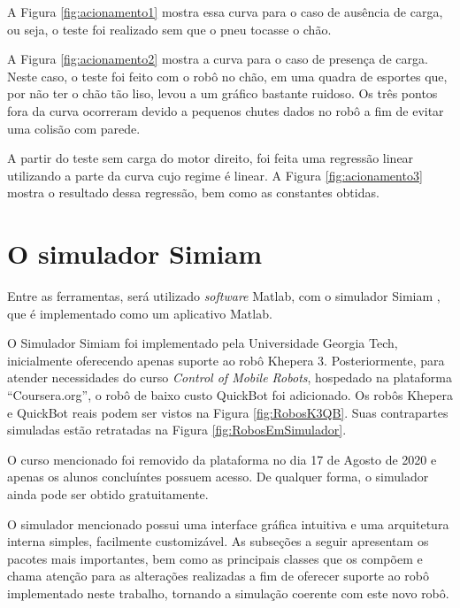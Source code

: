 	A Figura \ref{fig:acionamento1} mostra essa curva para o caso de ausência de carga, ou
	seja, o teste foi realizado sem que o pneu tocasse o chão. 
	
	
	
	A Figura \ref{fig:acionamento2} mostra a curva para o caso de presença de carga. Neste
	caso, o teste foi feito com o robô no chão, em uma quadra de esportes que, por não ter 
	o chão tão liso, levou a um gráfico bastante ruidoso. Os três pontos fora da curva 
	ocorreram devido a pequenos chutes dados no robô a fim de evitar uma colisão com parede.
	
	
	
	A partir do teste sem carga do motor direito, foi feita uma regressão linear utilizando 
	a parte da curva cujo regime é linear. A Figura \ref{fig:acionamento3} mostra o resultado 
	dessa regressão, bem como as constantes obtidas.
	
	

\section{O simulador Simiam}

Entre as ferramentas, será utilizado \textit{software} Matlab, com o
simulador Simiam \cite{Simiam}, que é implementado como um aplicativo Matlab.

O Simulador Simiam foi implementado pela Universidade Georgia Tech, 
inicialmente oferecendo apenas suporte ao robô Khepera 3. Posteriormente, 
para atender necessidades do curso \textit{Control of Mobile Robots}, hospedado 
na plataforma ``Coursera.org'', o robô de baixo custo QuickBot foi adicionado. 
Os robôs Khepera e QuickBot reais podem ser vistos na Figura \ref{fig:RobosK3QB}. 
Suas contrapartes simuladas estão retratadas na Figura \ref{fig:RobosEmSimulador}.

O curso mencionado foi removido da plataforma no dia 17 de Agosto de 2020 e apenas
os alunos concluíntes possuem acesso. De qualquer forma, o simulador ainda pode ser
obtido gratuitamente.





O simulador mencionado possui uma interface gráfica intuitiva e uma arquitetura 
interna simples, facilmente customizável. As subseções a seguir apresentam os 
pacotes mais importantes, bem como as principais classes que os compõem e chama 
atenção para as alterações realizadas a fim de oferecer suporte ao robô implementado
neste trabalho, tornando a simulação coerente com este novo robô.

